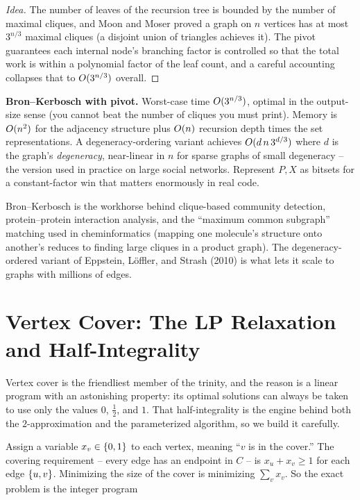 \begin{proof}[Idea]
The number of leaves of the recursion tree is bounded by the number of maximal
cliques, and Moon and Moser proved a graph on $n$ vertices has at most $3^{n/3}$
maximal cliques (a disjoint union of triangles achieves it). The pivot guarantees
each internal node's branching factor is controlled so that the total work is
within a polynomial factor of the leaf count, and a careful accounting collapses
that to $O(3^{n/3})$ overall.
\end{proof}

\begin{complexitybox}
\textbf{Bron--Kerbosch with pivot.} Worst-case time $O(3^{n/3})$, optimal in
the output-size sense (you cannot beat the number of cliques you must print).
Memory is $O(n^2)$ for the adjacency structure plus $O(n)$ recursion depth
times the set representations. A degeneracy-ordering variant achieves
$O(d\,n\,3^{d/3})$ where $d$ is the graph's \emph{degeneracy}, near-linear in
$n$ for sparse graphs of small degeneracy -- the version used in practice on
large social networks. Represent $P,X$ as bitsets for a constant-factor win that
matters enormously in real code.
\end{complexitybox}

\begin{applicationbox}
Bron--Kerbosch is the workhorse behind clique-based community detection,
protein--protein interaction analysis, and the ``maximum common subgraph''
matching used in cheminformatics (mapping one molecule's structure onto
another's reduces to finding large cliques in a product graph). The
degeneracy-ordered variant of Eppstein, L\"offler, and Strash (2010) is what lets
it scale to graphs with millions of edges.
\end{applicationbox}

\section{Vertex Cover: The LP Relaxation and Half-Integrality}
\label{ch29:lp}

Vertex cover is the friendliest member of the trinity, and the reason is a linear
program with an astonishing property: its optimal solutions can always be taken
to use only the values $0$, $\tfrac12$, and $1$. That half-integrality is the
engine behind both the $2$-approximation and the parameterized algorithm, so we
build it carefully.

Assign a variable $x_v\in\{0,1\}$ to each vertex, meaning ``$v$ is in the
cover.'' The covering requirement -- every edge has an endpoint in $C$ -- is
$x_u+x_v\ge 1$ for each edge $\{u,v\}$. Minimizing the size of the cover is
minimizing $\sum_v x_v$. So the exact problem is the integer program

